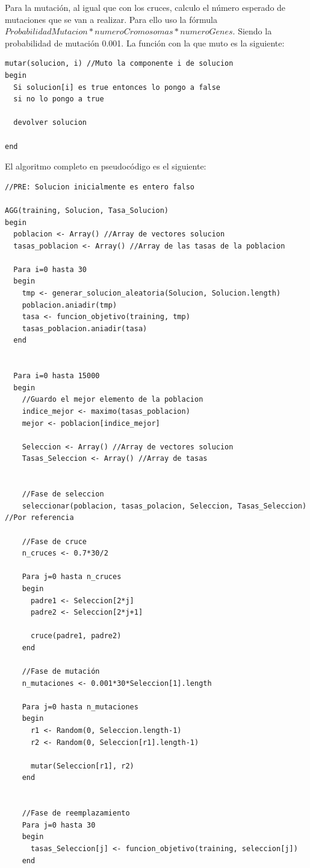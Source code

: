Para la mutación, al igual que con los cruces, calculo el número esperado de mutaciones que se van a realizar. Para ello uso la fórmula $ProbabilidadMutacion * numeroCromosomas * numeroGenes$. Siendo la probabilidad de mutación 0.001. La función con la que muto es la siguiente:

\begin{lstlisting}
mutar(solucion, i) //Muto la componente i de solucion
begin
  Si solucion[i] es true entonces lo pongo a false
  si no lo pongo a true
  
  devolver solucion
  
end
\end{lstlisting}

El algoritmo completo en pseudocódigo es el siguiente:
\begin{lstlisting}
//PRE: Solucion inicialmente es entero falso

AGG(training, Solucion, Tasa_Solucion)
begin
  poblacion <- Array() //Array de vectores solucion
  tasas_poblacion <- Array() //Array de las tasas de la poblacion
  
  Para i=0 hasta 30
  begin
    tmp <- generar_solucion_aleatoria(Solucion, Solucion.length)
    poblacion.aniadir(tmp)
    tasa <- funcion_objetivo(training, tmp)
    tasas_poblacion.aniadir(tasa)
  end
  
  
  Para i=0 hasta 15000
  begin
    //Guardo el mejor elemento de la poblacion
    indice_mejor <- maximo(tasas_poblacion)
    mejor <- poblacion[indice_mejor]
    
    Seleccion <- Array() //Array de vectores solucion
    Tasas_Seleccion <- Array() //Array de tasas
    
    
    //Fase de seleccion
    seleccionar(poblacion, tasas_polacion, Seleccion, Tasas_Seleccion) //Por referencia
    
    //Fase de cruce
    n_cruces <- 0.7*30/2
    
    Para j=0 hasta n_cruces
    begin
      padre1 <- Seleccion[2*j]
      padre2 <- Seleccion[2*j+1]
      
      cruce(padre1, padre2)
    end
    
    //Fase de mutación
    n_mutaciones <- 0.001*30*Seleccion[1].length
    
    Para j=0 hasta n_mutaciones
    begin
      r1 <- Random(0, Seleccion.length-1)
      r2 <- Random(0, Seleccion[r1].length-1)
      
      mutar(Seleccion[r1], r2)
    end
    
    
    //Fase de reemplazamiento
    Para j=0 hasta 30
    begin
      tasas_Seleccion[j] <- funcion_objetivo(training, seleccion[j])
    end
    

\end{lstlisting}
